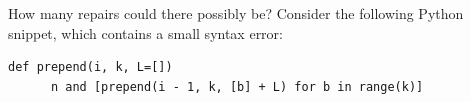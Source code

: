 \documentclass{beamer}
\begin{document}
%
%
%
%
%
%
%
%

\begin{frame}[t,fragile]{How many repairs could there possibly be?}
  Consider the following Python snippet, which contains a small syntax error:\\

  \begin{lstlisting}[escapechar=!, basicstyle=\linespread{1.3}\ttfamily\footnotesize]
    def prepend(i, k, L=[])
      n and [prepend(i - 1, k, [b] + L) for b in range(k)]
  \end{lstlisting}
\end{frame}
\end{document}
